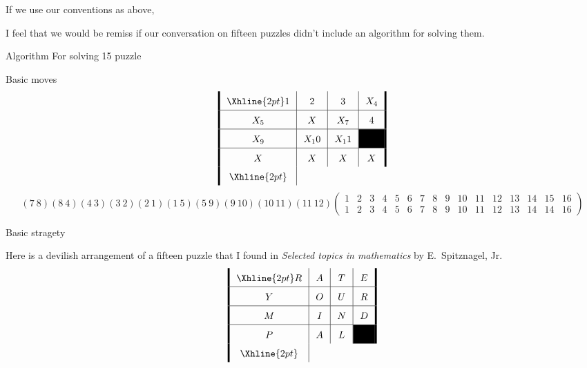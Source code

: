 \documentclass{ximera}
\begin{document}
\begin{theorem}
  If we use our conventions as above, 
\end{theorem}


I feel that we would be remiss if our conversation on fifteen puzzles
didn't include an algorithm for solving them.


\begin{theorem}
  Algorithm For solving 15 puzzle

  Basic moves
  \[
  \arraycolsep=7pt\def\arraystretch{1.6}
  \begin{array}{!{\vline width 2pt}c|c|c|c!{\vline width 2pt}}
    \Xhline{2pt}
    1  & 2 & 3  & X_4 \\ \hline
    X_5  & X & X_7  & 4 \\ \hline
    X_9  & X_10 & X_11  & \cellcolor{black} \\ \hline
    X  & X & X  & X \\
    \Xhline{2pt}
  \end{array}
  \]
  \[
  (7 \ 8)(8 \ 4)(4 \ 3)(3 \ 2) (2 \ 1)(1\ 5)(5\ 9)(9 \ 10)(10\ 11)(11 \ 12) 
  \left(\begin{smallmatrix}
    1 & 2 & 3 & 4 & 5 & 6 & 7 & 8 & 9 & 10 & 11 & 12 & 13 & 14 & 15 & 16\\
    1 & 2 & 3 & 4 & 5 & 6 & 7 & 8 & 9 & 10 & 11 & 12 & 13 & 14 & 14 & 16
  \end{smallmatrix}\right)
  \]
  
  Basic stragety
\end{theorem}



\begin{exercise}
  Here is a devilish arrangement of a fifteen puzzle that I found in
  \textit{Selected topics in mathematics} by E.\ Spitznagel, Jr.
  \[
  \arraycolsep=7pt\def\arraystretch{1.6}
  \begin{array}{!{\vline width 2pt}c|c|c|c!{\vline width 2pt}}
    \Xhline{2pt}
    R  & A  & T  & E \\ \hline
    Y  & O  & U  & R \\ \hline
    M  & I & N & D \\ \hline
    P & A & L & \cellcolor{black}\\
    \Xhline{2pt}
  \end{array}
  \]
\end{exercise}
\end{document}
